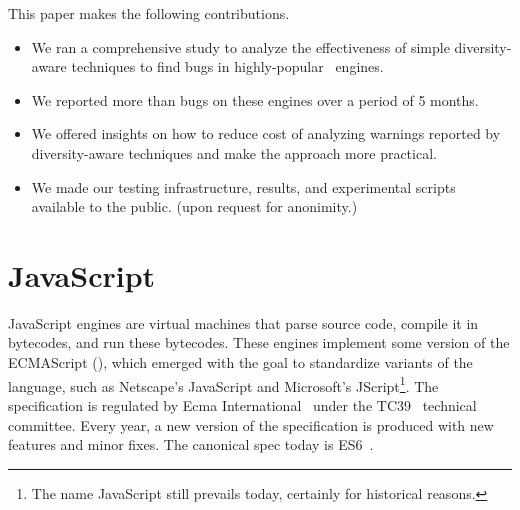 \documentclass[10pt,conference,anonymous]{IEEEtran}
\begin{document}
This paper makes the following contributions.
\begin{itemize}
  \item We ran a comprehensive study to analyze the effectiveness of
    simple diversity-aware techniques to find bugs in highly-popular
    \js\ engines. 
    
  \item We reported more than  bugs on these engines over a
    period of 5 months.

  \item We offered insights on how to reduce cost of analyzing
    warnings reported by diversity-aware techniques and make the
    approach more practical.
    
  \item We made our testing infrastructure, results, and experimental
    scripts available to the public. (upon request for anonimity.)
\end{itemize}



\section{JavaScript}
\label{sec:es6-design}
\label{sec:imp-dep-behavior}

JavaScript engines are virtual machines that parse source code,
compile it in bytecodes, and run these bytecodes. These engines
implement some version of the ECMAScript (\es{}), which emerged with
the goal to standardize variants of the language, such as Netscape's
JavaScript and Microsoft's JScript\footnote{The name JavaScript still
  prevails today, certainly for historical reasons.}. The \es{}
specification is regulated by Ecma International~\cite{es6-website}
under the TC39~\cite{tc39-github} technical committee.  Every year, a
new version of the \es{} specification is produced with new features
and minor fixes. The canonical spec today is
ES6~\cite{ecmas262-spec-repo,ecmas262-spec}.

\end{document}
